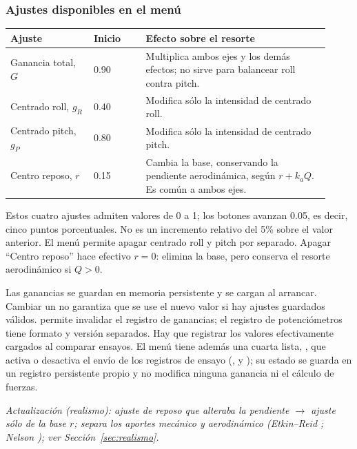 \subsubsection{Ajustes disponibles en el menú}
\begin{longtable}{p{0.24\linewidth}p{0.15\linewidth}p{0.53\linewidth}}
\toprule Ajuste & Inicio & Efecto sobre el resorte\\\midrule\endhead
Ganancia total, $G$ & 0.90 & Multiplica ambos ejes y los demás efectos; no sirve para balancear roll contra pitch.\\
Centrado roll, $g_R$ & 0.40 & Modifica sólo la intensidad de centrado roll.\\
Centrado pitch, $g_P$ & 0.80 & Modifica sólo la intensidad de centrado pitch.\\
Centro reposo, $r$ & 0.15 & Cambia la base, conservando la pendiente aerodinámica, según $r+k_aQ$. Es común a ambos ejes.\\
\bottomrule
\end{longtable}
Estos cuatro ajustes admiten valores de 0 a 1; los botones avanzan 0.05, es decir, cinco puntos porcentuales. No es un incremento relativo del 5\% sobre el valor anterior. El menú permite apagar centrado roll y pitch por separado. Apagar ``Centro reposo'' hace efectivo $r=0$: elimina la base, pero conserva el resorte aerodinámico si $Q>0$.

Las ganancias se guardan en memoria persistente y se cargan al arrancar. Cambiar un  no garantiza que se use el nuevo valor si hay ajustes guardados válidos.  permite invalidar el registro de ganancias; el registro de potenciómetros tiene formato y versión separados. Hay que registrar los valores efectivamente cargados al comparar ensayos. El menú tiene además una cuarta lista, , que activa o desactiva el envío de los registros de ensayo (,  y ); su estado se guarda en un registro persistente propio y no modifica ninguna ganancia ni el cálculo de fuerzas.

\textit{Actualización (realismo): ajuste de reposo que alteraba la pendiente $\rightarrow$ ajuste sólo de la base $r$; separa los aportes mecánico y aerodinámico (Etkin--Reid \cite{etkin1996}; Nelson \cite{nelson1998}); ver Sección~\ref{sec:realismo}.}

